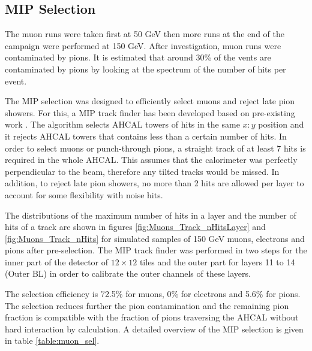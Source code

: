 \subsection{MIP Selection}
\label{subsec:Muon_sel}

The muon runs were taken first at 50 GeV then more runs at the end of the campaign were performed at 150 GeV. After investigation, muon runs were contaminated by pions. It is estimated that around 30\% of the vents are contaminated by pions by looking at the spectrum of the number of hits per event.

The MIP selection was designed to efficiently select muons and reject late pion showers. For this, a MIP track finder has been developed based on pre-existing work \cite{Hartbrich:2016bbz}. The algorithm selects AHCAL towers of hits in the same $x:y$ position and it rejects AHCAL towers that contains less than a certain number of hits. In order to select muons or punch-through pions, a straight track of at least 7 hits is required in the whole AHCAL. This assumes that the calorimeter was perfectly perpendicular to the beam, therefore any tilted tracks would be missed. In addition, to reject late pion showers, no more than 2 hits are allowed per layer to account for some flexibility with noise hits.

The distributions of the maximum number of hits in a layer and the number of hits of a track are shown in figures \ref{fig:Muons_Track_nHitsLayer} and \ref{fig:Muons_Track_nHits} for simulated samples of 150 GeV muons, electrons and pions after pre-selection. The MIP track finder was performed in two steps for the inner part of the detector of $12 \times 12$ tiles and the outer part for layers 11 to 14 (Outer BL) in order to calibrate the outer channels of these layers.

The selection efficiency is 72.5\% for muons, 0\% for electrons and 5.6\% for pions. The selection reduces further the pion contamination and the remaining pion fraction is compatible with the fraction of pions traversing the AHCAL without hard interaction by calculation. A detailed overview of the MIP selection is given in table \ref{table:muon_sel}.

